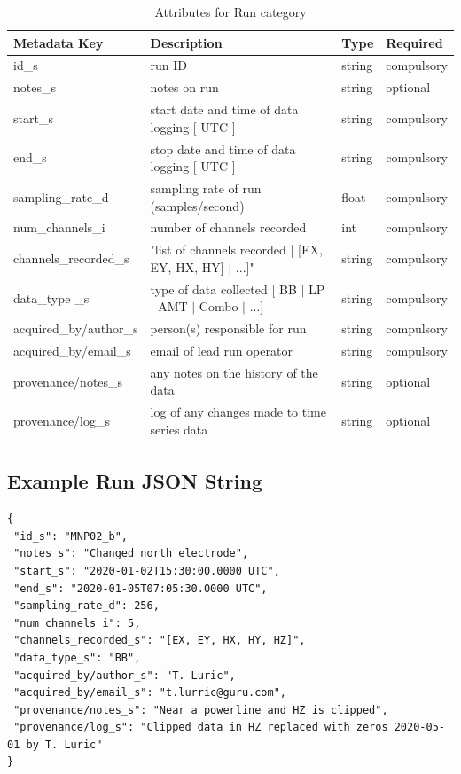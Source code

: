 \documentclass{article}
\begin{document}
\begin{table}[htb!]
	\caption[Attributes for Run]{Attributes for Run category}
	\begin{tabular}{|l|p{3in}|l|l|}
		\hline
		\textbf{Metadata Key} & \textbf{Description} & \textbf{Type} & \textbf{Required} \\ \hline
		id\_s & run ID & string & compulsory \\ \hline
		notes\_s & notes on run & string & optional \\ \hline
		start\_s & start date and time of data logging [ UTC ] & string & compulsory \\ \hline
		end\_s & stop date and time of data logging [ UTC ] & string & compulsory \\ \hline
		sampling\_rate\_d & sampling rate of run (samples/second) & float & compulsory \\ \hline
		num\_channels\_i & number of channels recorded & int & compulsory \\ \hline
		channels\_recorded\_s & "list of channels recorded [ [EX, EY, HX, HY] $|$ ...]" & string & compulsory \\ \hline
		data\_type \_s & type of data collected [ BB $|$ LP $|$ AMT $|$ Combo $|$ ...] & string & compulsory \\ \hline
		acquired\_by/author\_s & person(s) responsible for run & string & compulsory \\ \hline
		acquired\_by/email\_s & email of lead run operator & string & compulsory \\ \hline
		provenance/notes\_s & any notes on the history of the data & string & optional \\ \hline
		provenance/log\_s & log of any changes made to time series data & string & optional \\ \hline
	\end{tabular}
	\label{tab:run}
\end{table}

\subsection{Example Run JSON String}

\begin{verbatim}
{
 "id_s": "MNP02_b",
 "notes_s": "Changed north electrode",
 "start_s": "2020-01-02T15:30:00.0000 UTC",
 "end_s": "2020-01-05T07:05:30.0000 UTC",
 "sampling_rate_d": 256,
 "num_channels_i": 5,
 "channels_recorded_s": "[EX, EY, HX, HY, HZ]",
 "data_type_s": "BB",
 "acquired_by/author_s": "T. Luric",
 "acquired_by/email_s": "t.lurric@guru.com",
 "provenance/notes_s": "Near a powerline and HZ is clipped",
 "provenance/log_s": "Clipped data in HZ replaced with zeros 2020-05-01 by T. Luric"
}
\end{verbatim}
\end{document}
